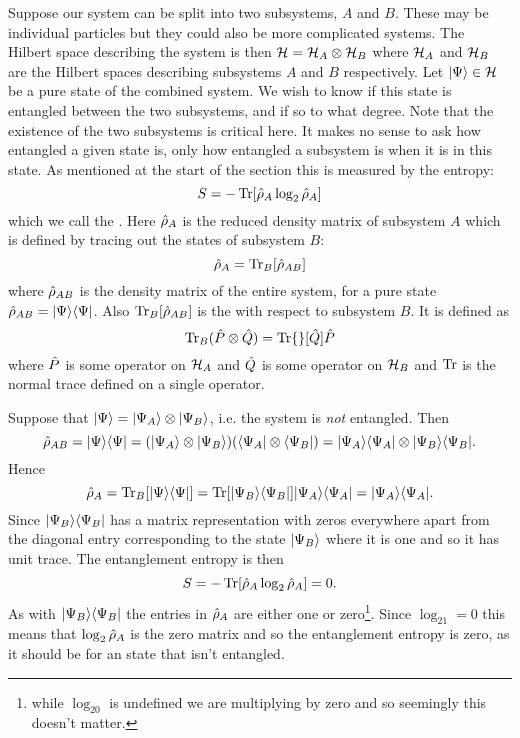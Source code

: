     Suppose our system can be split into two subsystems, \(A\) and \(B\).
    These may be individual particles but they could also be more complicated systems.
    The Hilbert space describing the system is then \(\mathcal{H} = \mathcal{H}_A \otimes \mathcal{H}_B\) where \(\mathcal{H}_A\) and \(\mathcal{H}_B\) are the Hilbert spaces describing subsystems \(A\) and \(B\) respectively.
    Let \(\vert {\Psi} \rangle\in\mathcal{H}\) be a pure state of the combined system.
    We wish to know if this state is entangled between the two subsystems, and if so to what degree.
    Note that the existence of the two subsystems is critical here. 
    It makes no sense to ask how entangled a given state is, only how entangled a subsystem is when it is in this state.
    As mentioned at the start of the section this is measured by the entropy:
    \[S = -\Tr[\hat{\rho}_A\log_2\hat{\rho}_A]\]
    which we call the .
    Here \(\hat{\rho}_A\) is the reduced density matrix of subsystem \(A\) which is defined by tracing out the states of subsystem \(B\):
    \[\hat{\rho}_A = \Tr_B[\hat{\rho}_{AB}]\]
    where \(\hat{\rho}_{AB}\) is the density matrix of the entire system, for a pure state \(\hat{\rho}_{AB} = \vert {\Psi}\rangle\langle {\Psi} \vert\).
    Also \(\Tr_B[\hat{\rho}_{AB}]\) is the  with respect to subsystem \(B\).
    It is defined as
    \[\Tr_B(\hat{P}\otimes\hat{Q}) = \Tr{}[\hat{Q}]\hat{P}\]
    where \(\hat{P}\) is some operator on \(\mathcal{H}_A\) and \(\hat{Q}\) is some operator on \(\mathcal{H}_B\) and \(\Tr\) is the normal trace defined on a single operator.
    
    \begin{example}
        Suppose that \(\vert {\Psi} \rangle = \vert {\Psi_A} \rangle\otimes\vert {\Psi_B} \rangle\), i.e. the system is \emph{not} entangled.
        Then 
        \[\hat{\rho}_{AB} = \vert {\Psi}\rangle\langle {\Psi} \vert = (\vert {\Psi_A} \rangle\otimes\vert {\Psi_B} \rangle)(\langle {\Psi_A} \vert\otimes\langle {\Psi_B} \vert) = \vert {\Psi_A}\rangle\langle {\Psi_A} \vert\otimes\vert {\Psi_B}\rangle\langle {\Psi_B} \vert.\]
        Hence
        \[\hat{\rho}_A = \Tr_B[\vert {\Psi}\rangle\langle {\Psi} \vert] = \Tr[\vert {\Psi_B}\rangle\langle {\Psi_B} \vert]\vert {\Psi_A}\rangle\langle {\Psi_A} \vert = \vert {\Psi_A}\rangle\langle {\Psi_A} \vert.\]
        Since \(\vert {\Psi_B}\rangle\langle {\Psi_B} \vert\) has a matrix representation with zeros everywhere apart from the diagonal entry corresponding to the state \(\vert {\Psi_B} \rangle\) where it is one and so it has unit trace.
        The entanglement entropy is then
        \[S = -\Tr[\hat{\rho}_A\log_2\hat{\rho}_A] = 0.\]
        As with \(\vert {\Psi_B}\rangle\langle {\Psi_B} \vert\) the entries in \(\hat{\rho}_A\) are either one or zero\footnote{while \(\log_20\) is undefined we are multiplying by zero and so seemingly this doesn't matter.}.
        Since \(\log_21 = 0\) this means that \(\log_2\hat{\rho}_A\) is the zero matrix and so the entanglement entropy is zero, as it should be for an state that isn't entangled.
    \end{example}
    
